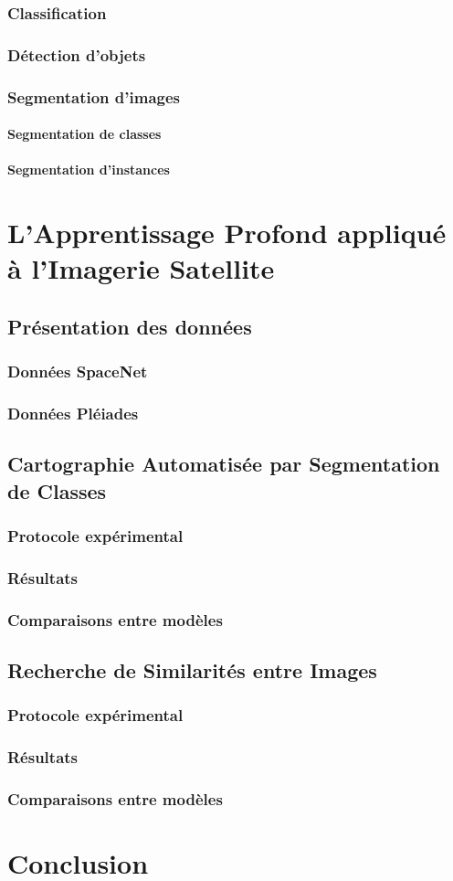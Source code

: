 \documentclass[10pt,a4paper]{report}
\begin{document}
			\subsection{Classification}
			\subsection{Détection d'objets}
			\subsection{Segmentation d'images}
				\subsubsection{Segmentation de classes}
				\subsubsection{Segmentation d'instances}
	\chapter{L'Apprentissage Profond appliqué à l'Imagerie Satellite}
		\section{Présentation des données}
			\subsection{Données SpaceNet}
			\subsection{Données Pléiades}
		\section{Cartographie Automatisée par Segmentation de Classes}
			\subsection{Protocole expérimental}
			\subsection{Résultats}
			\subsection{Comparaisons entre modèles}
		\section{Recherche de Similarités entre Images}
			\subsection{Protocole expérimental}
			\subsection{Résultats}
			\subsection{Comparaisons entre modèles}
	\chapter{Conclusion}
\end{document}
